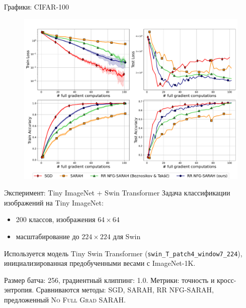\documentclass{beamer}
\theoremstyle{plain}
\begin{document}
\begin{frame}{Графики: CIFAR-100}
\begin{figure}
\centering
\includegraphics[width=\linewidth]{../figures/CIFAR100_LR=0.7_plots_compressed.pdf}
\end{figure}
\end{frame}

\begin{frame}{Эксперимент: Tiny ImageNet + Swin Transformer}
    Задача классификации изображений на Tiny ImageNet:
    \begin{itemize}
        \item 200 классов, изображения $64\times64$
        \item масштабирование до $224\times224$ для Swin
    \end{itemize}

    Используется модель Tiny Swin Transformer (\texttt{swin\_T\_patch4\_window7\_224}), инициализированная предобученными весами с ImageNet-1K.

    Размер батча: 256, градиентный клиппинг: 1.0. Метрики: точность и кросс-энтропия. Сравниваются методы: \textsc{SGD}, \textsc{SARAH}, RR \textsc{NFG-SARAH}, предложенный \textsc{No Full Grad SARAH}.
\end{frame}
\end{document}
